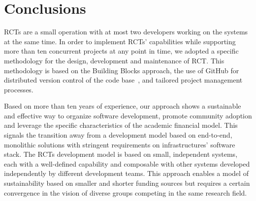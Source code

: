 \documentclass[preprint,12pt, a4paper]{elsarticle}
\begin{document}
\section{Conclusions}\label{sec:conclusions}

RCTs are a small operation with at most two developers working on the systems at
the same time. In order to implement RCTs' capabilities while supporting more
than ten concurrent projects at any point in time, we adopted a specific
methodology for the design, development and maintenance of RCT\@. This
methodology is based on the Building Blocks approach, the use of GitHub for
distributed version control of the code base~\cite{github-rct}, and tailored
project management processes.

Based on more than ten years of experience, our approach shows a sustainable and effective way to organize software development, promote community adoption and
leverage the specific characteristics of the academic financial model. This
signals the transition away from a development model based on end-to-end,
monolithic solutions with stringent requirements on infrastructures' software
stack. The RCTs development model is based on small, independent systems, each
with a well-defined capability and composable with other systems developed
independently by different development teams. This approach enables a model of
sustainability based on smaller and shorter funding sources but requires a
certain convergence in the vision of diverse groups competing in the same
research field.

\end{document}
